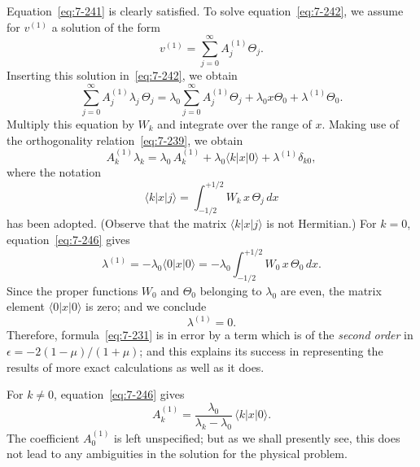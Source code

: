 Equation~\eqref{eq:7-241} is clearly satisfied.  To solve equation~\eqref{eq:7-242}, we assume
for $v^{(1)}$ a solution of the form
\begin{equation}
\label{eq:7-244}
v^{(1)} = \sum_{j=0}^{\infty} A_j^{(1)}\Theta_j.
\end{equation}
Inserting this solution in~\eqref{eq:7-242}, we obtain
\begin{equation}
\label{eq:7-245}
\sum_{j=0}^{\infty} A_j^{(1)}\lambda_j\,\Theta_j
= \lambda_0 \sum_{j=0}^{\infty} A_j^{(1)}\Theta_j
+ \lambda_0 x\Theta_0 + \lambda^{(1)}\Theta_0.
\end{equation}
Multiply this equation by $W_k$ and integrate over the range of $x$.  Making
use of the orthogonality relation~\eqref{eq:7-239}, we obtain
\begin{equation}
\label{eq:7-246}
A_k^{(1)}\lambda_k = \lambda_0\, A_k^{(1)}
+ \lambda_0\langle k|x|0\rangle + \lambda^{(1)}\delta_{k0},
\end{equation}
where the notation
\begin{equation}
\label{eq:7-247}
\langle k|x|j\rangle = \int_{-1/2}^{+1/2} W_k\, x\,\Theta_j\, dx
\end{equation}
has been adopted.  (Observe that the matrix $\langle k|x|j\rangle$ is not Hermitian.)
For $k = 0$, equation~\eqref{eq:7-246} gives
\begin{equation}
\label{eq:7-248}
\lambda^{(1)} = -\lambda_0\langle 0|x|0\rangle = -\lambda_0
\int_{-1/2}^{+1/2} W_0\, x\, \Theta_0\, dx.
\end{equation}
Since the proper functions $W_0$ and $\Theta_0$ belonging to $\lambda_0$ are even, the matrix
element $\langle 0|x|0\rangle$ is zero; and we conclude
\begin{equation}
\label{eq:7-249}
\lambda^{(1)} = 0.
\end{equation}
Therefore, formula~\eqref{eq:7-231} is in error by a term which is of the \emph{second
order} in $\epsilon = -2(1-\mu)/(1+\mu)$; and this explains its success in representing the results of more exact calculations as well as it does.

For $k \neq 0$, equation~\eqref{eq:7-246} gives
\begin{equation}
\label{eq:7-250}
A_k^{(1)} = \frac{\lambda_0}{\lambda_k-\lambda_0}\,\langle k|x|0\rangle.
\end{equation}
The coefficient $A_0^{(1)}$ is left unspecified; but as we shall presently see, this
does not lead to any ambiguities in the solution for the physical problem.

